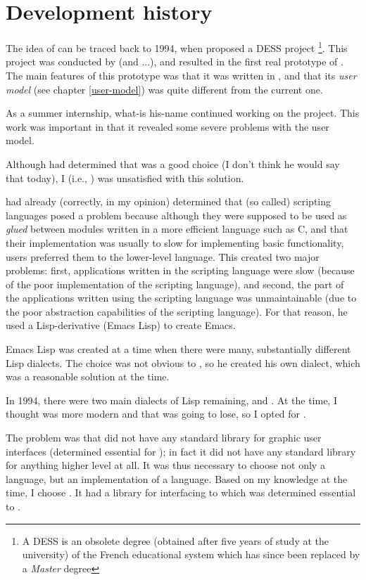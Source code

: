 \chapter{Development history}

The idea of {\gs} can be traced back to 1994, when {\rs} proposed a
DESS project \footnote{A DESS is an obsolete degree (obtained after
five years of study at the university) of the French educational
system which has since been replaced by a \emph{Master} degree}.
This project was conducted by {\kerhoas} (and ...), and resulted
in the first real prototype of {\gs}.  The main features of this
prototype was that it was written in {\tcl}, and that its \emph{user
  model} (see chapter \ref{user-model}) was quite different from the
current one. 

As a summer internship, what-is his-name continued working on the
project.  This work was important in that it revealed some severe
problems with the user model.

Although {\kerhoas} had determined that {\tcl} was a good choice (I
don't think he would say that today), I (i.e., {\rs}) was unsatisfied
with this solution.

{\rms} had already (correctly, in my opinion) determined that (so
called) scripting languages posed a problem because although they were
supposed to be used as \emph{glued} between modules written in a more
efficient language such as C, and that their implementation was
usually to slow for implementing basic functionality, users preferred
them to the lower-level language.  This created two major problems:
first, applications written in the scripting language were slow
(because of the poor implementation of the scripting language), and
second, the part of the applications written using the scripting
language was unmaintainable (due to the poor abstraction capabilities
of the scripting language).  For that reason, he used a
Lisp-derivative (Emacs Lisp) to create Emacs.  

Emacs Lisp was created at a time when there were many, substantially
different Lisp dialects.  The choice was not obvious to {\rms}, so he
created his own dialect, which was a reasonable solution at the time. 

In 1994, there were two main dialects of Lisp remaining, {\commonlisp} and
{\scheme}.  At the time, I thought {\scheme} was more modern and that
{\commonlisp} was going to lose, so I opted for {\scheme}.

The problem was that {\scheme} did not have any standard library for
graphic user interfaces (determined essential for {\gs}); in fact it
did not have any standard library for anything higher level at all.
It was thus necessary to choose not only a language, but an
implementation of a language.  Based on my knowledge at the time, I
choose {\elk}.  It had a library for interfacing to {\xwin} which was
determined essential to {\gs}.

